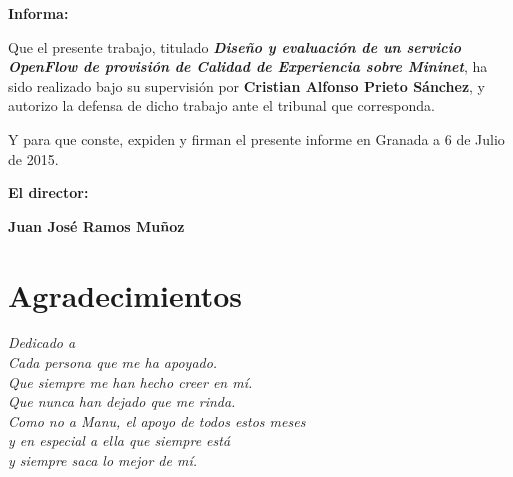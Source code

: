 \vspace{0.5cm}

\textbf{Informa:}

\vspace{0.5cm}

Que el presente trabajo, titulado \textit{\textbf{Diseño y evaluación de un servicio OpenFlow de provisión de Calidad de Experiencia sobre Mininet}},
ha sido realizado bajo su supervisión por \textbf{Cristian Alfonso Prieto Sánchez}, y autorizo la defensa de dicho trabajo ante el tribunal
que corresponda.

\vspace{0.5cm}

Y para que conste, expiden y firman el presente informe en Granada a 6 de Julio de 2015.

\vspace{1cm}

\textbf{El director:}

\vspace{5cm}

\noindent \textbf{Juan José Ramos Muñoz}

\chapter*{Agradecimientos}
\thispagestyle{empty}

       \vspace{1cm}


\begin{flushright}
\textit{Dedicado a \\
Cada persona que me ha apoyado. \\
Que siempre me han hecho creer en mí. \\
Que nunca han dejado que me rinda.\\
Como no a Manu, el apoyo de todos estos meses\\
y en especial a ella que siempre está \\
y siempre saca lo mejor de mí.}
\end{flushright}

